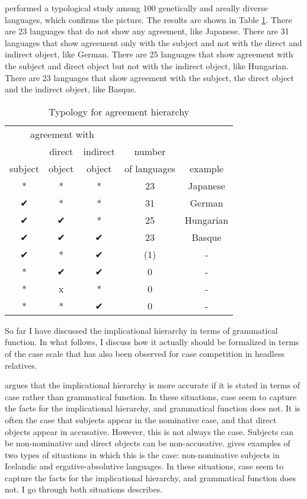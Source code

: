 \citet{gilligan1987} performed a typological study among 100 genetically and areally diverse languages, which confirms the picture. The results are shown in Table \ref{tbl:agr-typo}. There are 23 languages that do not show any agreement, like Japanese. There are 31 languages that show agreement only with the subject and not with the direct and indirect object, like German. There are 25 languages that show agreement with the subject and direct object but not with the indirect object, like Hungarian. There are 23 languages that show agreement with the subject, the direct object and the indirect object, like Basque.

 \begin{table}[ht]
   \center
   \caption {Typology for agreement hierarchy}
     \begin{tabular}[t]{ccccc}
       \toprule
           \multicolumn{3}{c}{agreement with} &              &         \\
       \cmidrule{1-3}
                    & direct & indirect       & number       &         \\
           subject  & object & object         & of languages & example \\
       \cmidrule{1-3} \cmidrule{4-4} \cmidrule{5-5}
           *    & * & * & 23  & Japanese    \\
           ✔    & * & * & 31  & German     \\
           ✔    & ✔ & * & 25  & Hungarian  \\
           ✔    & ✔ & ✔ & 23  & Basque     \\
           ✔    & * & ✔ & (1) & -          \\
           {*}  & ✔ & ✔ & 0   & -          \\
           {*}  & x & * & 0   & -          \\
           {*}  & * & ✔ & 0   & -          \\
       \bottomrule
     \end{tabular}
     \label{tbl:agr-typo}
 \end{table}

So far I have discussed the implicational hierarchy in terms of grammatical function. In what follows, I discuss how it actually should be formalized in terms of the case scale that has also been observed for case competition in headless relatives.

\citet{bobaljik2006} argues that the implicational hierarchy is more accurate if it is stated in terms of case rather than grammatical function. In these situations, case seem to capture the facts for the implicational hierarchy, and grammatical function does not. It is often the case that subjects appear in the nominative case, and that direct objects appear in accusative. However, this is not always the case. Subjects can be non-nominative and direct objects can be non-accusative. \citeauthor{bobaljik2006} gives examples of two types of situations in which this is the case: non-nominative subjects in Icelandic and ergative-absolutive languages. In these situations, case seem to capture the facts for the implicational hierarchy, and grammatical function does not. I go through both situations \citeauthor{bobaljik2006} describes.

